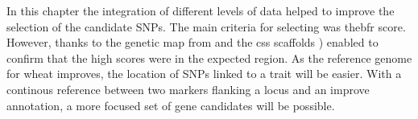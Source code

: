 
In this chapter the integration of different levels of data helped to improve the selection of the candidate SNPs. 
The main criteria for selecting   was the\acrshort{bfr} score.
However, thanks to the genetic map from \citet{Wang2014} and the \acrshort{css} scaffolds \citep{Mayer2014}) enabled to confirm that the high scores were in the expected region. 
As the reference genome for wheat improves, the location of SNPs linked to a trait will be easier. 
With a continous reference between two markers flanking a locus and an improve annotation, a more focused set of gene candidates will be possible. 

